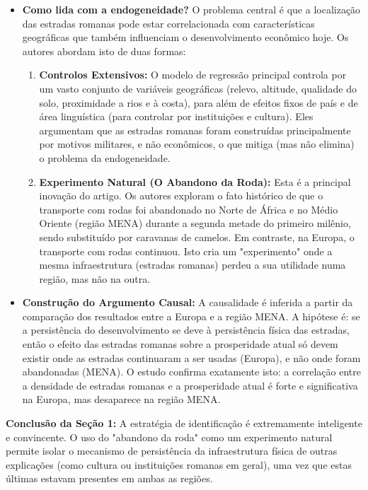 \documentclass[12pt, a4paper]{article}
\begin{document}
\begin{itemize}
    \item \textbf{Como lida com a endogeneidade?} O problema central é que a localização das estradas romanas pode estar correlacionada com características geográficas que também influenciam o desenvolvimento econômico hoje. Os autores abordam isto de duas formas:
        \begin{enumerate}
            \item \textbf{Controlos Extensivos:} O modelo de regressão principal controla por um vasto conjunto de variáveis geográficas (relevo, altitude, qualidade do solo, proximidade a rios e à costa), para além de efeitos fixos de país e de área linguística (para controlar por instituições e cultura). Eles argumentam que as estradas romanas foram construídas principalmente por motivos militares, e não econômicos, o que mitiga (mas não elimina) o problema da endogeneidade.
            \item \textbf{Experimento Natural (O Abandono da Roda):} Esta é a principal inovação do artigo. Os autores exploram o fato histórico de que o transporte com rodas foi abandonado no Norte de África e no Médio Oriente (região MENA) durante a segunda metade do primeiro milênio, sendo substituído por caravanas de camelos. Em contraste, na Europa, o transporte com rodas continuou. Isto cria um "experimento" onde a mesma infraestrutura (estradas romanas) perdeu a sua utilidade numa região, mas não na outra.
        \end{enumerate}

    \item \textbf{Construção do Argumento Causal:} A causalidade é inferida a partir da comparação dos resultados entre a Europa e a região MENA. A hipótese é: se a persistência do desenvolvimento se deve à persistência física das estradas, então o efeito das estradas romanas sobre a prosperidade atual só devem existir onde as estradas continuaram a ser usadas (Europa), e não onde foram abandonadas (MENA). O estudo confirma exatamente isto: a correlação entre a densidade de estradas romanas e a prosperidade atual é forte e significativa na Europa, mas desaparece na região MENA.
\end{itemize}

\noindent\textbf{Conclusão da Seção 1:} A estratégia de identificação é extremamente inteligente e convincente. O uso do "abandono da roda" como um experimento natural permite isolar o mecanismo de persistência da infraestrutura física de outras explicações (como cultura ou instituições romanas em geral), uma vez que estas últimas estavam presentes em ambas as regiões.
\end{document}
